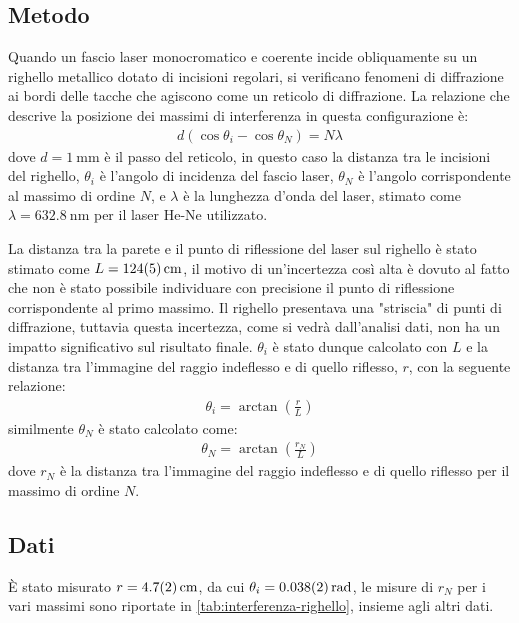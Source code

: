 \documentclass[a4paper]{article}
\begin{document}
\subsection{Metodo}
Quando un fascio laser monocromatico e coerente incide obliquamente su un righello metallico dotato di incisioni regolari, si verificano fenomeni di diffrazione ai bordi delle tacche che agiscono come un reticolo di diffrazione. La relazione che descrive la posizione dei massimi di interferenza in questa configurazione è: 
\begin{align}
    d(\cos\theta_i - \cos\theta_N) = N\lambda
\end{align}
dove $d=\SI{1}{\milli\meter}$ è il passo del reticolo, in questo caso la distanza tra le incisioni del righello, $\theta_i$ è l'angolo di incidenza del fascio laser, $\theta_N$ è l'angolo corrispondente al massimo di ordine $N$, e $\lambda$ è la lunghezza d'onda del laser, stimato come $\lambda=\SI{632.8}{\nano\meter}$ per il laser He-Ne utilizzato.

La distanza tra la parete e il punto di riflessione del laser sul righello è stato stimato come $L=\SI{124 \pm 5}{\centi\meter}$, il motivo di un'incertezza così alta è dovuto al fatto che non è stato possibile individuare con precisione il punto di riflessione corrispondente al primo massimo. Il righello presentava una "striscia" di punti di diffrazione, tuttavia questa incertezza, come si vedrà dall'analisi dati, non ha un impatto significativo sul risultato finale. $\theta_i$ è stato dunque calcolato con $L$ e la distanza tra l'immagine del raggio indeflesso e di quello riflesso, $r$, con la seguente relazione:
\begin{align}   
    \theta_i = \arctan\left(\frac{r}{L}\right)
\end{align}
similmente $\theta_N$ è stato calcolato come:
\begin{align}
    \theta_N = \arctan\left(\frac{r_N}{L}\right)
\end{align}
dove $r_N$ è la distanza tra l'immagine del raggio indeflesso e di quello riflesso per il massimo di ordine $N$.
\subsection{Dati}
È stato misurato $r=\SI{4.7 \pm 0.2}{\centi\meter}$, da cui $\theta_i=\SI{0.038 \pm 0.002}{\radian}$, le misure di $r_N$ per i vari massimi sono riportate in \cref{tab:interferenza-righello}, insieme agli altri dati.
\end{document}
